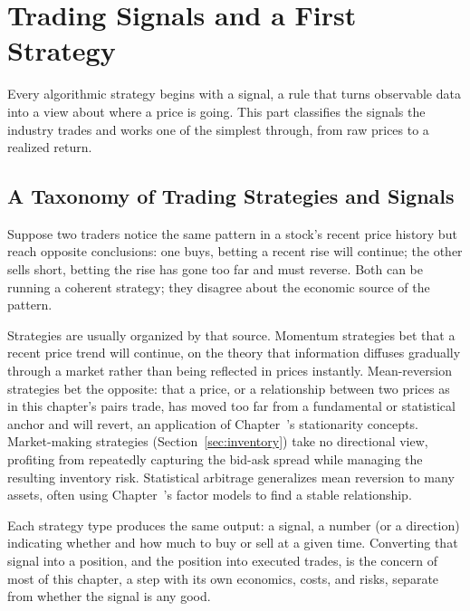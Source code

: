 \documentclass[../ai_in_finance]{subfiles}
\begin{document}
\section{Trading Signals and a First Strategy}

Every algorithmic strategy begins with a signal, a rule that turns observable data into a view about where a price is going. This part classifies the signals the industry trades and works one of the simplest through, from raw prices to a realized return.

\subsection{A Taxonomy of Trading Strategies and Signals}
\label{sec:taxonomy}

Suppose two traders notice the same pattern in a stock's recent price history but reach opposite conclusions: one buys, betting a recent rise will continue; the other sells short, betting the rise has gone too far and must reverse. Both can be running a coherent strategy; they disagree about the economic source of the pattern.

Strategies are usually organized by that source. Momentum strategies bet that a recent price trend will continue, on the theory that information diffuses gradually through a market rather than being reflected in prices instantly. Mean-reversion strategies bet the opposite: that a price, or a relationship between two prices as in this chapter's pairs trade, has moved too far from a fundamental or statistical anchor and will revert, an application of Chapter~'s stationarity concepts. Market-making strategies (Section~\ref{sec:inventory}) take no directional view, profiting from repeatedly capturing the bid-ask spread while managing the resulting inventory risk. Statistical arbitrage generalizes mean reversion to many assets, often using Chapter~'s factor models to find a stable relationship.

Each strategy type produces the same output: a signal, a number (or a direction) indicating whether and how much to buy or sell at a given time. Converting that signal into a position, and the position into executed trades, is the concern of most of this chapter, a step with its own economics, costs, and risks, separate from whether the signal is any good.
\end{document}
